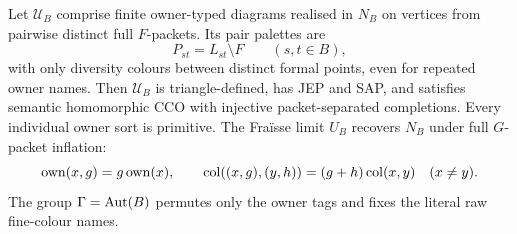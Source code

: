 \begin{theorem}
\label{thm:joint-transversal}
\label{lem:full-owner-transversal}
Let $\mathcal U_B$ comprise finite owner-typed diagrams
realised in $N_B$ on vertices from pairwise distinct
full $F$-packets.  Its pair palettes are
\[
          P_{st}=L_{st}\setminus F\qquad(s,t\in B),
\]
with only diversity colours between distinct formal points,
even for repeated owner names.  Then $\mathcal U_B$ is
triangle-defined, has JEP and SAP, and satisfies semantic
homomorphic CCO with injective packet-separated completions.
Every individual owner sort is primitive.  The Fra\"isse
limit $U_B$ recovers $N_B$ under full $G$-packet inflation:
\begin{equation}\label{eq:full-owner-inflation}
 \operatorname{own}(x,g)=g\operatorname{own}(x),\qquad
 \operatorname{col}((x,g),(y,h))=(g+h)\operatorname{col}(x,y)\quad(x\ne y).
\end{equation}
The group $\Gamma=\operatorname{Aut}(B)$ permutes only the owner tags
and fixes the literal raw fine-colour names.
\end{theorem}

